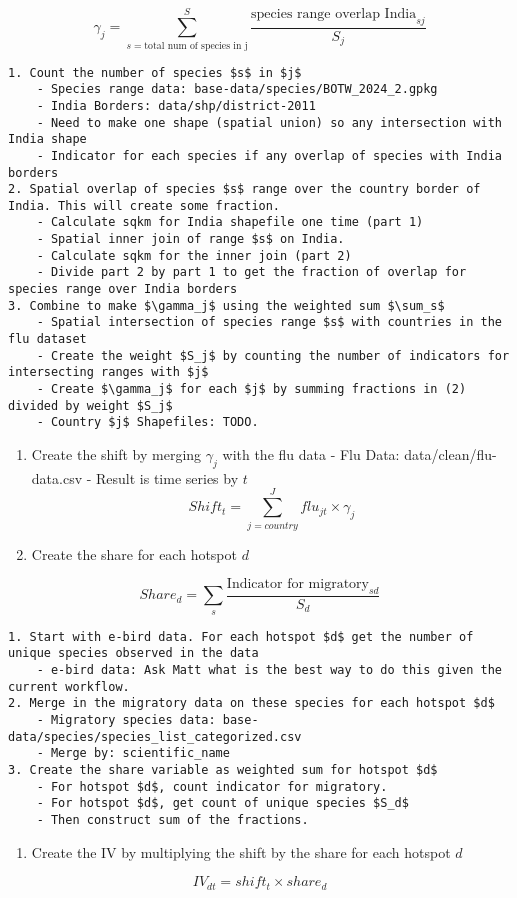 \documentclass[
  letterpaper,
]{article}
\providecommand{\tightlist}{%
  \setlength{\itemsep}{0pt}\setlength{\parskip}{0pt}}\usepackage{longtable,booktabs,array}
\begin{document}
\begin{tcolorbox}
\[
\gamma_j = \sum_{s =\text{total num of species in j}}^S \frac{\text{species range overlap India}_{sj}}{S_j}
\]

\begin{verbatim}
1. Count the number of species $s$ in $j$
    - Species range data: base-data/species/BOTW_2024_2.gpkg
    - India Borders: data/shp/district-2011
    - Need to make one shape (spatial union) so any intersection with India shape
    - Indicator for each species if any overlap of species with India borders
2. Spatial overlap of species $s$ range over the country border of India. This will create some fraction. 
    - Calculate sqkm for India shapefile one time (part 1)
    - Spatial inner join of range $s$ on India. 
    - Calculate sqkm for the inner join (part 2)
    - Divide part 2 by part 1 to get the fraction of overlap for species range over India borders
3. Combine to make $\gamma_j$ using the weighted sum $\sum_s$
    - Spatial intersection of species range $s$ with countries in the flu dataset
    - Create the weight $S_j$ by counting the number of indicators for intersecting ranges with $j$
    - Create $\gamma_j$ for each $j$ by summing fractions in (2) divided by weight $S_j$
    - Country $j$ Shapefiles: TODO.
\end{verbatim}

\begin{enumerate}
\def\labelenumi{\arabic{enumi}.}
\setcounter{enumi}{2}
\item
  Create the shift by merging \(\gamma_j\) with the flu data - Flu Data:
  data/clean/flu-data.csv - Result is time series by \(t\) \[
  Shift_t = \sum_{j = country}^J flu_{jt} \times \gamma_j
  \]
\item
  Create the share for each hotspot \(d\)
\end{enumerate}

\[
Share_d =  \sum_s \frac{\text{Indicator for migratory}_{sd}}{S_d}
\]

\begin{verbatim}
1. Start with e-bird data. For each hotspot $d$ get the number of unique species observed in the data
    - e-bird data: Ask Matt what is the best way to do this given the current workflow. 
2. Merge in the migratory data on these species for each hotspot $d$
    - Migratory species data: base-data/species/species_list_categorized.csv
    - Merge by: scientific_name
3. Create the share variable as weighted sum for hotspot $d$
    - For hotspot $d$, count indicator for migratory. 
    - For hotspot $d$, get count of unique species $S_d$
    - Then construct sum of the fractions. 
\end{verbatim}

\begin{enumerate}
\def\labelenumi{\arabic{enumi}.}
\setcounter{enumi}{4}
\tightlist
\item
  Create the IV by multiplying the shift by the share for each hotspot
  \(d\)
\end{enumerate}

\[
IV_{dt} = shift_t \times share_d
\]

\end{tcolorbox}
\end{document}
